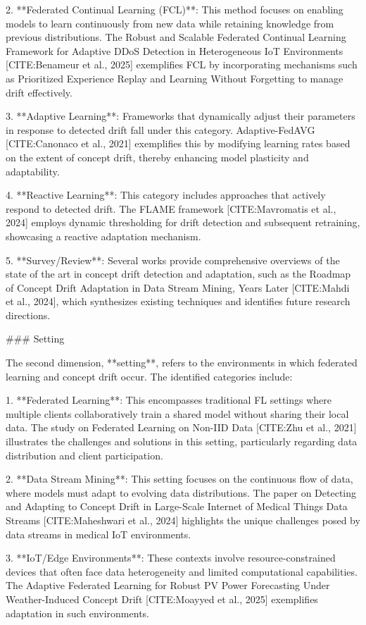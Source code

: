 \documentclass[journal]{IEEEtran}
\begin{document}
2. **Federated Continual Learning (FCL)**: This method focuses on enabling models to learn continuously from new data while retaining knowledge from previous distributions. The Robust and Scalable Federated Continual Learning Framework for Adaptive DDoS Detection in Heterogeneous IoT Environments [CITE:Benameur et al., 2025] exemplifies FCL by incorporating mechanisms such as Prioritized Experience Replay and Learning Without Forgetting to manage drift effectively.

3. **Adaptive Learning**: Frameworks that dynamically adjust their parameters in response to detected drift fall under this category. Adaptive-FedAVG [CITE:Canonaco et al., 2021] exemplifies this by modifying learning rates based on the extent of concept drift, thereby enhancing model plasticity and adaptability.

4. **Reactive Learning**: This category includes approaches that actively respond to detected drift. The FLAME framework [CITE:Mavromatis et al., 2024] employs dynamic thresholding for drift detection and subsequent retraining, showcasing a reactive adaptation mechanism.

5. **Survey/Review**: Several works provide comprehensive overviews of the state of the art in concept drift detection and adaptation, such as the Roadmap of Concept Drift Adaptation in Data Stream Mining, Years Later [CITE:Mahdi et al., 2024], which synthesizes existing techniques and identifies future research directions.

\#\#\# Setting

The second dimension, **setting**, refers to the environments in which federated learning and concept drift occur. The identified categories include:

1. **Federated Learning**: This encompasses traditional FL settings where multiple clients collaboratively train a shared model without sharing their local data. The study on Federated Learning on Non-IID Data [CITE:Zhu et al., 2021] illustrates the challenges and solutions in this setting, particularly regarding data distribution and client participation.

2. **Data Stream Mining**: This setting focuses on the continuous flow of data, where models must adapt to evolving data distributions. The paper on Detecting and Adapting to Concept Drift in Large-Scale Internet of Medical Things Data Streams [CITE:Maheshwari et al., 2024] highlights the unique challenges posed by data streams in medical IoT environments.

3. **IoT/Edge Environments**: These contexts involve resource-constrained devices that often face data heterogeneity and limited computational capabilities. The Adaptive Federated Learning for Robust PV Power Forecasting Under Weather-Induced Concept Drift [CITE:Moayyed et al., 2025] exemplifies adaptation in such environments.
\end{document}
